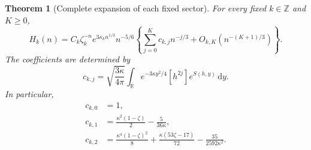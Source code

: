 \documentclass[11pt]{article}
\newtheorem{theorem}{Theorem}[section]
\theoremstyle{remark}\newtheorem{remark}[theorem]{Remark}
\newcommand{\dd}{\,\mathrm d}
\newcommand{\Z}{\mathbb Z}
\newcommand{\R}{\mathbb R}
\begin{document}
\begin{theorem}[Complete expansion of each fixed sector]\label{vav:hk:thm:allorders}
For every fixed $k\in\Z$ and $K\geq0$,
\begin{equation}\label{vav:hk:eq:allorders}
 H_k(n)=C_k\zeta_k^{-n}e^{3\kappa_kn^{1/3}}n^{-5/6}
 \left\{\sum_{j=0}^Kc_{k,j}n^{-j/3}
       +O_{k,K}(n^{-(K+1)/3})\right\}.
\end{equation}
The coefficients are determined by
\begin{equation}\label{vav:hk:eq:cj}
 c_{k,j}=\sqrt{\frac{3\kappa}{4\pi}}
 \int_\R e^{-3\kappa y^2/4}[h^{2j}]e^{S(h,y)}\dd y.
\end{equation}
In particular,
\begin{align}
 c_{k,0}&=1,\label{vav:hk:eq:c0}\\
 c_{k,1}&=\frac{\kappa^2(1-\zeta)}2-\frac5{36\kappa},\label{vav:hk:eq:c1}\\
 c_{k,2}&=\frac{\kappa^4(1-\zeta)^2}{8}
          +\frac{\kappa(53\zeta-17)}{72}
          -\frac{35}{2592\kappa^2}.\label{vav:hk:eq:c2}
\end{align}
\end{theorem}
\end{document}
